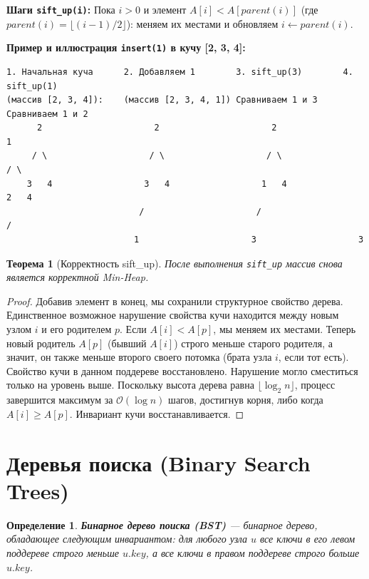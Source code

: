\documentclass[12pt,a4paper]{article}
\newtheorem{definition}{Определение}
\newtheorem{theorem}{Теорема}
\begin{document}
\textbf{Шаги \texttt{sift\_up(i)}:}
Пока $i > 0$ и элемент $A[i] < A[parent(i)]$ (где $parent(i) = \lfloor (i-1)/2 \rfloor$):
меняем их местами и обновляем $i \leftarrow parent(i)$.

\textbf{Пример и иллюстрация \texttt{insert(1)} в кучу [2, 3, 4]:}
\begin{verbatim}
1. Начальная куча      2. Добавляем 1        3. sift_up(3)        4. sift_up(1)
(массив [2, 3, 4]):    (массив [2, 3, 4, 1]) Сравниваем 1 и 3     Сравниваем 1 и 2
      2                      2                      2                    1
     / \                    / \                    / \                  / \
    3   4                  3   4                  1   4                2   4
                          /                      /                    /
                         1                      3                    3
\end{verbatim}

\begin{theorem}[Корректность sift\_up]
После выполнения \texttt{sift\_up} массив снова является корректной Min-Heap.
\end{theorem}
\begin{proof}
Добавив элемент в конец, мы сохранили структурное свойство дерева. Единственное возможное нарушение свойства кучи находится между новым узлом $i$ и его родителем $p$.
Если $A[i] < A[p]$, мы меняем их местами. Теперь новый родитель $A[p]$ (бывший $A[i]$) строго меньше старого родителя, а значит, он также меньше второго своего потомка (брата узла $i$, если тот есть). Свойство кучи в данном поддереве восстановлено. Нарушение могло сместиться только на уровень выше. Поскольку высота дерева равна $\lfloor \log_2 n \rfloor$, процесс завершится максимум за $\mathcal{O}(\log n)$ шагов, достигнув корня, либо когда $A[i] \ge A[p]$. Инвариант кучи восстанавливается.
\end{proof}

\section{Деревья поиска (Binary Search Trees)}

\begin{definition}
\textbf{Бинарное дерево поиска (BST)} — бинарное дерево, обладающее следующим инвариантом: для любого узла $u$ все ключи в его левом поддереве строго меньше $u.key$, а все ключи в правом поддереве строго больше $u.key$.
\end{definition}
\end{document}
